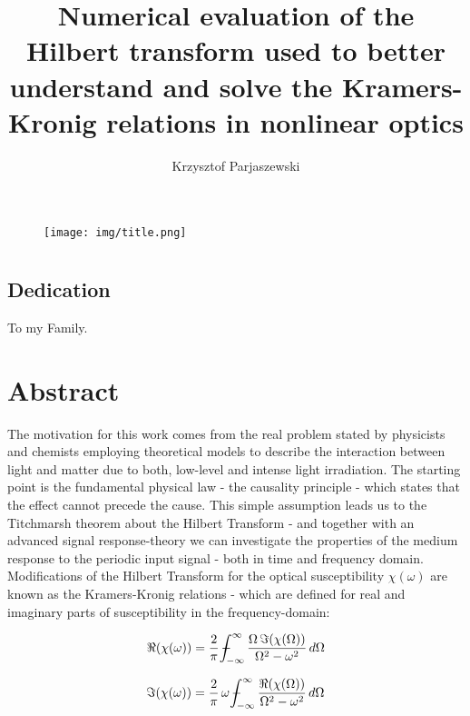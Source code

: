 \documentclass[12pt,twoside,a4paper]{article}
\title{Numerical evaluation of the Hilbert transform used to better understand 
and solve the Kramers-Kronig relations in nonlinear optics}
\author{Krzysztof Parjaszewski}
\date{}
\numberwithin{equation}{subsection}
\numberwithin{figure}{subsection}
\def\Xint#1{\mathchoice
{\XXint\displaystyle\textstyle{#1}}%
{\XXint\textstyle\scriptstyle{#1}}%
{\XXint\scriptstyle\scriptscriptstyle{#1}}%
{\XXint\scriptscriptstyle\scriptscriptstyle{#1}}%
\!\int}
\def\XXint#1#2#3{{\setbox0=\hbox{$#1{#2#3}{\int}$ }\vcenter{\hbox{$#2#3$ }}\kern-.6\wd0}}
\def\dashint{\Xint-}
\begin{document}
\maketitle


\begin{figure}[h]
  \begin{center}
    \texttt{[image: img/title.png]}
  \end{center}
\end{figure}


\section*{} \label{chap:preamble} 
\subsection*{Dedication} \label{chap:pre_dedication}


To my Family.


\section*{Abstract} \label{chap:abstract}

The motivation for this work comes from the real problem stated by physicists and chemists employing theoretical models to
describe the interaction between light and matter due to both, low-level and intense light irradiation. The starting point is the
fundamental physical law - the causality principle - which states that the effect cannot precede the cause. This simple assumption
leads us to the Titchmarsh theorem about the Hilbert Transform - and together with an advanced signal response-theory we can
investigate the properties of the medium response to the periodic input signal - both in time and frequency domain. Modifications
of the Hilbert Transform for the optical susceptibility $\chi (\omega )$ are known as the Kramers-Kronig relations - which are
defined for real and imaginary parts of susceptibility in the frequency-domain:

\begin{equation*}
  \Re (\chi (\omega ))=\frac {2}{\pi}\,\dashint_{ - \infty }^{\infty } \frac {\Omega \,\Im (\chi (\Omega ))}{\Omega ^{2} - \omega
  ^{2}} \,d\Omega 
\end{equation*}

\begin{equation*}
  \Im (\chi (\omega ))=\frac {2}{\pi}\,\omega \,\dashint_{ - \infty }^{\infty }\frac {\Re (\chi (\Omega ))}{\Omega ^{2} - \omega
  ^{2}}\, d\Omega 
\end{equation*}
\end{document}
